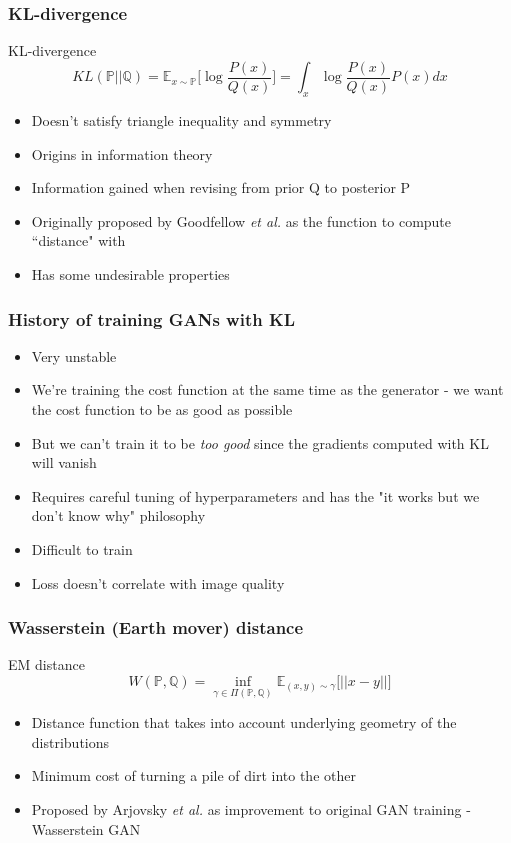 \documentclass{beamer}
\begin{document}
\begin{frame}
	\frametitle{KL-divergence}
	\begin{exampleblock}{KL-divergence}
	\[
		KL(\mathbb{P} \vert \vert \mathbb{Q}) = \mathbb{E}_{x \sim \mathbb{P}} \Big[ \log \frac{P(x)}{Q(x)} \Big] = \int_{x} \log \frac{P(x)}{Q(x)} P(x) dx
	\]
\end{exampleblock}
	\begin{itemize}
		\item Doesn't satisfy triangle inequality and symmetry
		\item Origins in information theory
		\item Information gained when revising from prior Q to posterior P
		\item Originally proposed by Goodfellow \textit{et al.} as the function to compute ``distance" with
		\item Has some undesirable properties
	\end{itemize}
\end{frame}

\begin{frame}
	\frametitle{History of training GANs with KL}
	\begin{itemize}
		\item Very unstable
		\item We're training the cost function at the same time as the generator - we want the cost function to be as good as possible
		\item But we can't train it to be \textit{too good} since the gradients computed with KL will vanish
		\item Requires careful tuning of hyperparameters and has the "it works but we don't know why" philosophy
		\item Difficult to train
		\item Loss doesn't correlate with image quality
	\end{itemize}
\end{frame}

\begin{frame}
	\frametitle{Wasserstein (Earth mover) distance}
	\begin{exampleblock}{EM distance}
	\[
		W(\mathbb{P}, \mathbb{Q}) = \inf_{\gamma \in \Pi(\mathbb{P}, \mathbb{Q})} {\mathbb{E}_{(x, y) \sim \gamma}} \big[ \lvert \lvert x - y \lvert \lvert \big]
	\]
\end{exampleblock}
	\begin{itemize}
		\item Distance function that takes into account underlying geometry of the distributions
		\item Minimum cost of turning a pile of dirt into the other
		\item Proposed by Arjovsky \textit{et al.} as improvement to original GAN training - Wasserstein GAN
	\end{itemize}
\end{frame}
\end{document}
